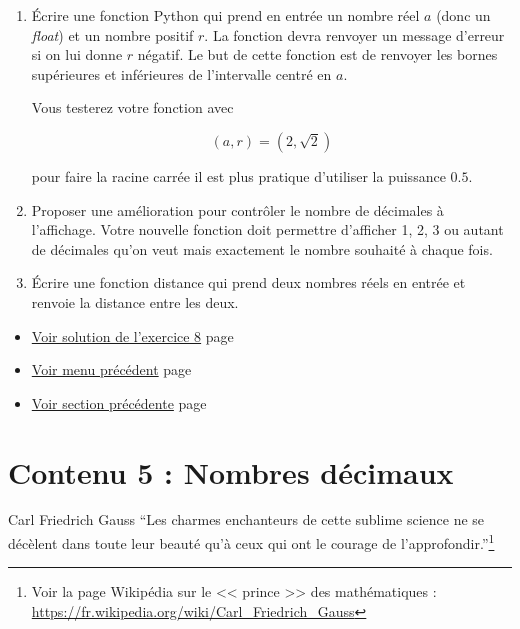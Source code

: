\documentclass[a4paper,11pt]{book}
\begin{document}
\begin{enumerate}
\item Écrire une fonction Python qui prend en
entrée un nombre réel \(a\) (donc un \emph{float}) et un nombre positif
\(r\). La fonction devra renvoyer un message d'erreur si on lui
donne \(r\) négatif. Le but de cette fonction est de renvoyer les
bornes supérieures et inférieures de l'intervalle
centré en \(a\).

Vous testerez votre fonction avec

\[(a, r) = (2, \sqrt{2})\]

pour faire la racine carrée il est plus pratique d'utiliser la
puissance \(0.5\).
\item Proposer une amélioration pour contrôler le
nombre de décimales à l'affichage. Votre
nouvelle fonction doit permettre d'afficher 1, 2, 3 ou autant de
décimales qu'on veut mais exactement le nombre souhaité à chaque fois.
\item Écrire une fonction distance qui prend deux nombres réels en entrée
et renvoie la distance entre les deux.
\end{enumerate}


\begin{itemize}
\item \hyperref[org01182cf]{Voir solution de l'exercice 8}
page~\pageref{page:sec8.4.2sol8}
\item \hyperref[orgb78d1c3]{Voir menu précédent}
page~\pageref{page:content4-menu}
\item \hyperref[orgac9e963]{Voir section précédente}
page~\pageref{page:sec2.4.4python}
\end{itemize}


\clearpage

\chapter{Contenu 5 : Nombres décimaux}
\label{sec:org9cab409}
\label{org86f143d}
\label{page:sec2.5content5}

\begin{myquote}{Carl Friedrich Gauss}
\enquote{Les charmes enchanteurs de cette sublime science ne se décèlent
dans toute leur beauté qu'à ceux qui ont le courage de
l'approfondir.}\footnote{Voir la page Wikipédia sur le << prince >> des
mathématiques : \url{https://fr.wikipedia.org/wiki/Carl_Friedrich_Gauss}}
\end{myquote}
\end{document}
